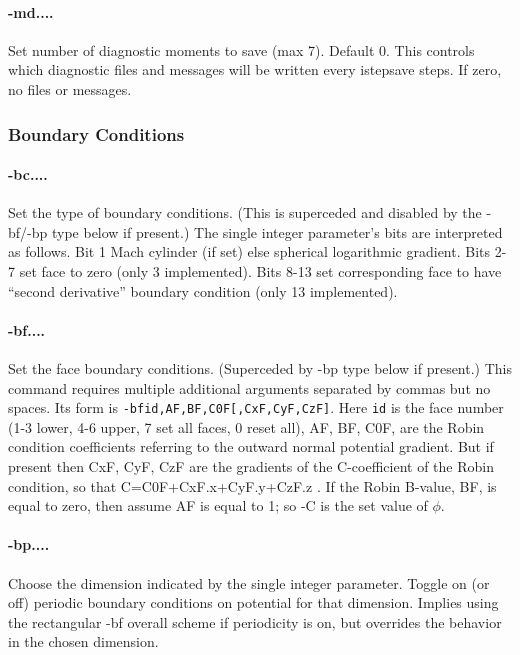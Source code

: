 \documentclass[12pt]{article}
\begin{document}
\paragraph{-md....}  Set number of diagnostic moments to save (max 7). Default 0.
This controls which diagnostic files and messages will be written
every istepsave steps. If zero, no files or messages.

\subsubsection*{Boundary Conditions}

\paragraph{-bc....} Set the type of boundary conditions. (This is
superceded and disabled by the -bf/-bp type below if present.) The single
integer parameter's bits are interpreted as follows.  Bit 1 Mach
cylinder (if set) else spherical logarithmic gradient.  Bits 2-7 set
face to zero (only 3 implemented). Bits 8-13 set corresponding face to
have ``second derivative'' boundary condition (only 13 implemented).

\paragraph{-bf....} Set the face boundary conditions. (Superceded by
-bp type below if present.) This command requires multiple additional
arguments separated by commas but no spaces. Its form is
\verb!-bfid,AF,BF,C0F[,CxF,CyF,CzF]!. Here \verb!id! is the face
number (1-3 lower, 4-6 upper, 7 set all faces, 0 reset all), AF, BF,
C0F, are the Robin condition coefficients referring to the outward
normal potential gradient. But if present then CxF, CyF, CzF are the
gradients of the C-coefficient of the Robin condition, so that
C=C0F+CxF.x+CyF.y+CzF.z . If the Robin B-value, BF, is equal to zero,
then assume AF is equal to 1; so -C is the set value of $\phi$.

\paragraph{-bp....} Choose the dimension indicated by the single
integer parameter. Toggle on (or off) periodic boundary conditions on
potential for that dimension. Implies using the rectangular -bf
overall scheme if periodicity is on, but overrides the behavior in the
chosen dimension.
\end{document}
